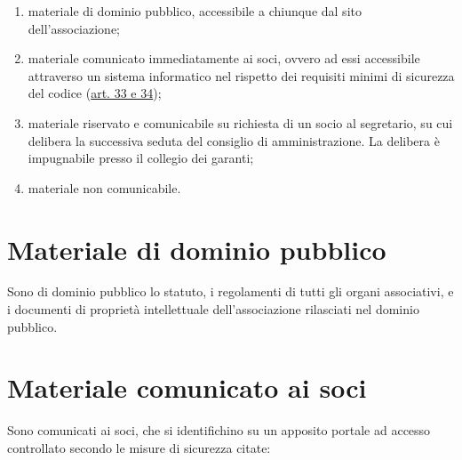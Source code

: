 \begin{enumerate}
    \item
        materiale di dominio pubblico, accessibile a chiunque dal sito
        dell'associazione;
    \item
        materiale comunicato immediatamente ai soci, ovvero ad essi
        accessibile attraverso un sistema informatico nel rispetto dei
        requisiti minimi di sicurezza del codice
        (\href{http://www.garanteprivacy.it/web/guest/home/docweb/-/docweb-display/docweb/1311248}{art.
        33 e 34});
    \item
        materiale riservato e comunicabile su richiesta di un socio al
        segretario, su cui delibera la successiva seduta del consiglio di
        amministrazione. La delibera è impugnabile presso il collegio dei
        garanti;
    \item
        materiale non comunicabile.
\end{enumerate}

\section{Materiale di dominio
pubblico}\label{materiale-di-dominio-pubblico}

Sono di dominio pubblico lo statuto, i regolamenti di tutti gli organi
associativi, e i documenti di proprietà intellettuale dell'associazione
rilasciati nel dominio pubblico.

\section{Materiale comunicato ai
soci}\label{materiale-comunicato-ai-soci}

Sono comunicati ai soci, che si identifichino su un apposito portale ad
accesso controllato secondo le misure di sicurezza citate:

